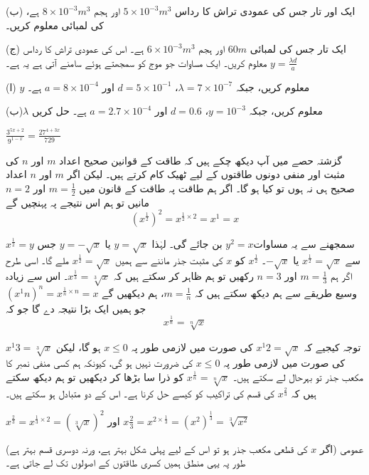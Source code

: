 (ب) ایک اور تار جس کی عمودی تراش کا رداس \(5\times 10^{-3}m^{3}\)  اور ہجم \(8\times 10^{-3}m^{3}\) ہے، کی لمبائی معلوم کریں۔

(ج) ایک تار جس کی لمبائی
 \(60m\) اور ہجم
 \(6\times 10^{-3}m^{3}\) ہے۔ اس کی عمودی تراش کا رداس معلوم کریں۔
ایک مساوات جو موج کو سمجھتے ہوئے سامنے آتی ہے یہ ہے۔
\(y=\frac{\lambda d}{a}\)

(ا) \(y\) معلوم کریں، جبکہ 
\(\lambda=7\times 10^{-7}\)،
\(d=5\times 10^{-1}\) اور 
\(a=8\times 10^{-4}\) ہے۔

(ب)\(\lambda\) معلوم کریں، جبکہ \(y=10^{-3}\)، 
\(d=0.6\) اور \(a=2.7\times 10^{-4}\)
 ہے۔
حل کریں

\(\frac{3^{5x+2}}{9^{1-x}}=\frac{27^{4+3x}}{729}\)

گزشتہ حصے میں آپ دیکھ چکے ہیں کہ طاقت کے قوانین صحیح اعداد 
\(m\)
 اور
 \(n\) 
کی مثبت اور منفی دونوں طاقتوں کے لیے ٹھیک کام کرتے ہیں۔ لیکن اگر 
\(m\) اور
 \(n\) اعداد صحیح ہی نہ ہوں تو کیا ہو گا۔
اگر ہم طاقت پہ طاقت کے قانون میں \(m=\frac{1}{2}\) اور \(n=2\) مانیں  تو ہم اس نتیجے پہ پہنچیں گے 
\[(x^{\frac{1}{2}})^{2}=x^{\frac{1}{2}\times 2}=x^{1}=x\]

\(x^{\frac{1}{2}}=y\) سمجھنے سے یہ مساوات\(y^{2}=x\) بن جائے گی۔
لہٰذا \(y=\sqrt{x}\) یا \(y=-\sqrt{x}\) جس سے 
\(x^{\frac{1}{2}}=\sqrt{x}\)
 یا \(-\sqrt{x}\)۔ 
\(x^{\frac{1}{2}}\)  کو \(x\) کی مثبت جذر ماننے سے ہمیں 
\(x^{\frac{1}{2}}=\sqrt{x}\) ملے گا۔
اسی طرح اگر ہم 
\(m=\frac{1}{3}\) اور \(n=3\) رکھیں تو ہم ظاہر کر سکتے ہیں کہ \(x^{\frac{1}{3}}=\sqrt[3]{x}\)۔ 
اس سے زیادہ وسیع طریقے سے ہم دیکھ سکتے ہیں کہ \(m=\frac{1}{n}\)، ہم دیکھیں گے \((x^{1}{n})^{n}=x^{\frac{1}{n}\times n}=x\)
جو ہمیں ایک بڑا نتیجہ دے گا جو کہ 
\[x^{\frac{1}{n}}=\sqrt[n]{x}\]

توجہ کیجیے کہ \(x^{1}{2}=\sqrt{x}\) کی صورت میں لازمی طور پہ \(x\le0\) ہو گا، لیکن \(x^{1}{3}=\sqrt[3]{x}\) کی صورت میں لازمی طور پہ \(x\le0\) کی ضرورت نہیں ہو گی، کیونکہ ہم کسی منفی نمبر کا مکعب جذر تو بہرحال لے سکتے ہیں۔
\(x^{\frac{1}{n}}=\sqrt[n]{x}\)
کو ذرا سا بڑھا کر دیکھیں تو ہم دیکھ سکتے ہیں کہ \(x^{\frac{2}{3}}\) کی قسم کی تراکیب کو کیسے حل کرنا ہے۔
اس کے دو متبادل ہو سکتے ہیں۔

\(x^{\frac{2}{3}}=x^{\frac{1}{3}\times 2}=(\sqrt[3]{x})^{2}\)
اور
\(x{\frac{2}{3}}=x^{2\times \frac{1}{3}}=(x^{2})^{\frac{1}{3}}=\sqrt[3]{x^{2}}\)

(اگر \(x\) کی قطعی مکعب جذر ہو تو اس کے لیے پہلی شکل بہتر ہے، ورنہ دوسری قسم بہتر ہے)
عمومی طور پہ یہی منطق ہمیں کسری طاقتوں کے اصولوں تک لے جاتی ہے۔

